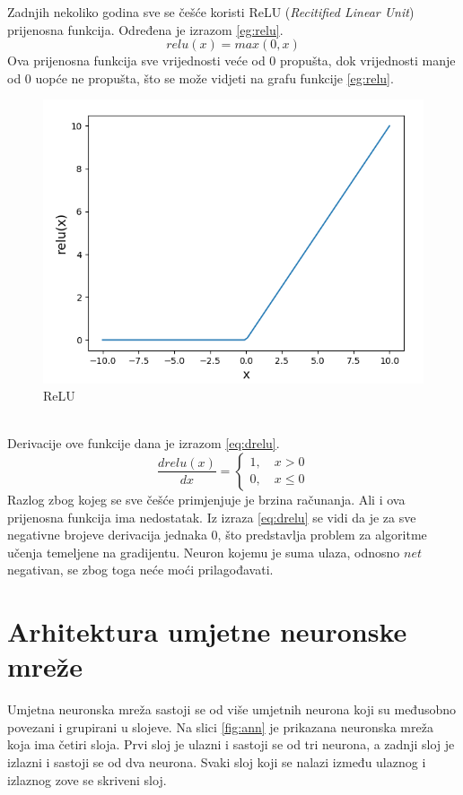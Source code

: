 \documentclass[times, utf8, zavrsni, numeric]{fer}
\begin{document}
Zadnjih nekoliko godina sve se češće koristi ReLU (\textit{Recitified Linear 
Unit}) prijenosna funkcija. Određena je izrazom \ref{eg:relu}.
\begin{equation}
	relu(x) = max(0, x)
	\label{eg:relu}
\end{equation}
Ova prijenosna funkcija sve vrijednosti veće od 0 propušta, dok vrijednosti manje 
od 0 uopće ne propušta, što se može vidjeti na grafu funkcije \ref{eg:relu}.
\begin{figure}[htb]
	\centering
	\includegraphics[scale=0.35]{relu_fun.png}
	\caption{ReLU}
	\label{fig:relu_fun}
\end{figure}
\\
Derivacije ove funkcije dana je izrazom \ref{eq:drelu}.
\begin{equation}
	\frac{drelu(x)}{dx} = 
	\begin{cases}
		1, \quad x > 0\\
		0, \quad x \leq 0
	\end{cases}
	\label{eq:drelu}
\end{equation}
Razlog zbog kojeg se sve češće primjenjuje je brzina računanja. Ali i ova 
prijenosna funkcija ima nedostatak. Iz izraza \ref{eq:drelu} se vidi da je 
za sve negativne brojeve derivacija jednaka 0, što predstavlja problem za
algoritme učenja temeljene na gradijentu. Neuron kojemu je suma ulaza, odnosno
$net$ negativan, se zbog toga neće moći prilagođavati.

\section{Arhitektura umjetne neuronske mreže}
Umjetna neuronska mreža sastoji se od više umjetnih neurona koji su međusobno
povezani i grupirani u slojeve. Na slici \ref{fig:ann} je prikazana neuronska
mreža koja ima četiri sloja. Prvi sloj je ulazni i sastoji se od tri neurona,
a zadnji sloj je izlazni i sastoji se od dva neurona. Svaki sloj koji se nalazi
između ulaznog i izlaznog zove se skriveni sloj. 
\end{document}
